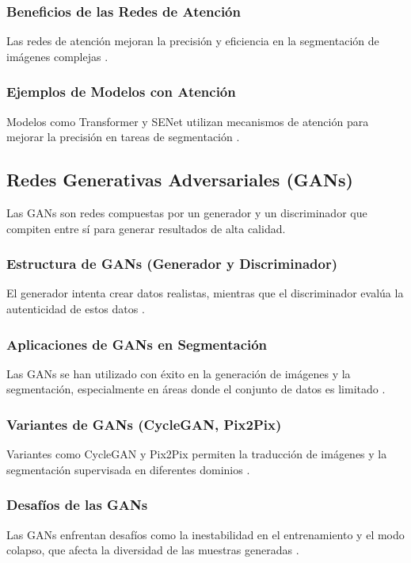 \subsubsection{Beneficios de las Redes de Atención}
Las redes de atención mejoran la precisión y eficiencia en la segmentación de imágenes complejas \cite{autor2021beneficios}.

\subsubsection{Ejemplos de Modelos con Atención}
Modelos como Transformer y SENet utilizan mecanismos de atención para mejorar la precisión en tareas de segmentación \cite{autor2022transformer}.

\subsection{Redes Generativas Adversariales (GANs)}
Las GANs son redes compuestas por un generador y un discriminador que compiten entre sí para generar resultados de alta calidad.

\subsubsection{Estructura de GANs (Generador y Discriminador)}
El generador intenta crear datos realistas, mientras que el discriminador evalúa la autenticidad de estos datos \cite{autor2020gans}.

\subsubsection{Aplicaciones de GANs en Segmentación}
Las GANs se han utilizado con éxito en la generación de imágenes y la segmentación, especialmente en áreas donde el conjunto de datos es limitado \cite{autor2021gans_segmentacion}.

\subsubsection{Variantes de GANs (CycleGAN, Pix2Pix)}
Variantes como CycleGAN y Pix2Pix permiten la traducción de imágenes y la segmentación supervisada en diferentes dominios \cite{autor2019cyclegan}.

\subsubsection{Desafíos de las GANs}
Las GANs enfrentan desafíos como la inestabilidad en el entrenamiento y el modo colapso, que afecta la diversidad de las muestras generadas \cite{autor2022challenges_gans}.


